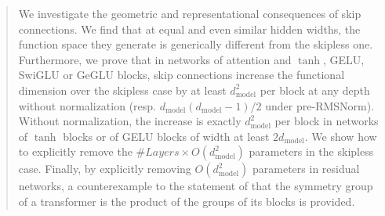 \documentclass[10pt]{article}
\theoremstyle{definition}
\theoremstyle{remark}
\newcommand{\dm}{d_{\mathrm{model}}}
\begin{document}
\begin{abstract}
\noindent We investigate the geometric and representational consequences of skip connections. We find that at equal and even similar hidden widths, the function space they generate is generically different from the skipless one. Furthermore, we prove that in networks of attention and $\tanh$, GELU, SwiGLU or GeGLU blocks, skip connections increase the functional dimension over the skipless case by at least $\dm^2$ per block at any depth without normalization (resp. $\dm(\dm-1)/2$ under pre-RMSNorm). Without normalization, the increase is exactly $\dm^2$ per block in networks of $\tanh$ blocks or of GELU blocks of width at least $2\dm$. We show how to explicitly remove the $\#Layers \times O(\dm^2)$ parameters in the skipless case. Finally, by explicitly removing $O(\dm^2)$ parameters in residual networks, a counterexample to the statement of \citet{wang2025gauge} that the symmetry group of a transformer is the product of the groups of its blocks is provided.



\end{abstract}
\end{document}
